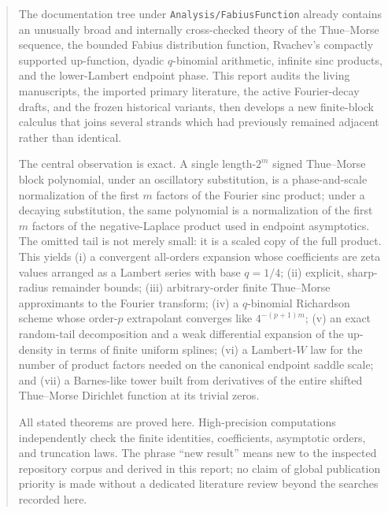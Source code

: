 \documentclass[11pt,oneside]{article}
\numberwithin{equation}{section}
\theoremstyle{definition}
\theoremstyle{remark}
\newcommand{\repo}{\nolinkurl{Analysis/FabiusFunction}}
\begin{document}
\begin{abstract}
The documentation tree under \repo{} already contains an unusually broad and internally
cross-checked theory of the Thue--Morse sequence, the bounded Fabius distribution function,
Rvachev's compactly supported up-function, dyadic $q$-binomial arithmetic, infinite sinc
products, and the lower-Lambert endpoint phase.  This report audits the living manuscripts,
the imported primary literature, the active Fourier-decay drafts, and the frozen historical
variants, then develops a new finite-block calculus that joins several strands which had
previously remained adjacent rather than identical.

The central observation is exact.  A single length-$2^m$ signed Thue--Morse block polynomial,
under an oscillatory substitution, is a phase-and-scale normalization of the first $m$ factors
of the Fourier sinc product; under a decaying substitution, the same polynomial is a
normalization of the first $m$ factors of the negative-Laplace product used in endpoint
asymptotics.  The omitted tail is not merely small: it is a scaled copy of the full product.
This yields (i) a convergent all-orders expansion whose coefficients are zeta values arranged
as a Lambert series with base $q=1/4$; (ii) explicit, sharp-radius remainder bounds;
(iii) arbitrary-order finite Thue--Morse approximants to the Fourier transform; (iv) a
$q$-binomial Richardson scheme whose order-$p$ extrapolant converges like
$4^{-(p+1)m}$; (v) an exact random-tail decomposition and a weak differential expansion of
the up-density in terms of finite uniform splines; (vi) a Lambert-$W$ law for the number of
product factors needed on the canonical endpoint saddle scale; and (vii) a Barnes-like tower
built from derivatives of the entire shifted Thue--Morse Dirichlet function at its trivial
zeros.

All stated theorems are proved here.  High-precision computations independently check the
finite identities, coefficients, asymptotic orders, and truncation laws.  The phrase
``new result'' means new to the inspected repository corpus and derived in this report; no
claim of global publication priority is made without a dedicated literature review beyond
the searches recorded here.
\end{abstract}
\end{document}
